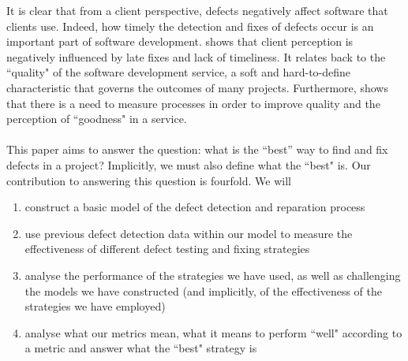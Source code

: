 It is clear that from a client perspective, defects negatively affect software that clients use. 
Indeed, how timely the detection and fixes of defects occur is an important part of software development.
\cite{gaugingStakeholderPerc} shows that client perception is negatively
influenced by late fixes and lack of timeliness.
It relates back to the ``quality" of the software development service, a soft and hard-to-define
characteristic that governs the outcomes of many projects.
Furthermore, \cite{green2005impacts} shows that there is a need to measure
processes in order to improve quality and the perception of ``goodness" in a
service.\\
\\
This paper aims to answer the question: what is the ``best” way to find and fix defects in a project?
Implicitly, we must also define what the ``best" is.
Our contribution to answering this question is fourfold.
We will
\begin{enumerate}
  \item construct a basic model of the defect detection and reparation process
  \item use previous defect detection data within our model to measure the effectiveness of different defect testing and fixing strategies
  \item analyse the performance of the strategies we have used, as well as challenging the models we have constructed (and implicitly, of the effectiveness of the strategies we have employed)
	\item analyse what our metrics mean, what it means to perform ``well" according to a metric and
answer what the ``best" strategy is
\end{enumerate}

